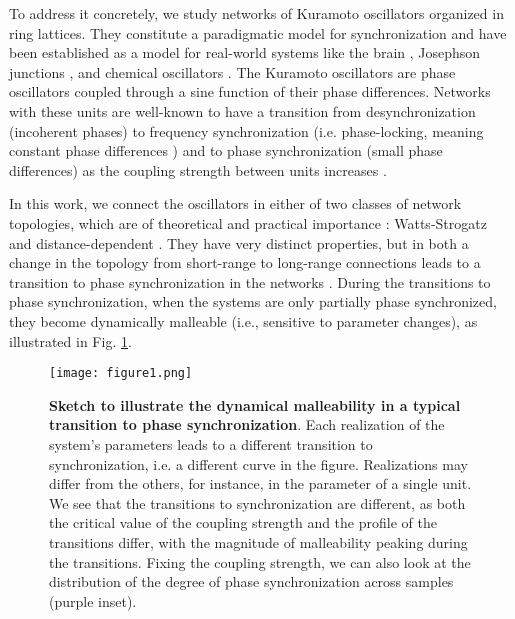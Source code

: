 To address it concretely, we study networks of Kuramoto oscillators organized in ring lattices. They constitute a paradigmatic model for synchronization \cite{kuramoto1975self,acebron2005kuramoto,rodrigues2016the} and have been established as a model for real-world systems like the brain \cite{poncealvarez2015restingstate, cabral2011role, rodrigues2016the}, Josephson junctions \cite{josephson1964coupled, crotty2010josephson}, and chemical oscillators \cite{marek1975synchronization, neu1979chemical}.  The Kuramoto oscillators are phase oscillators coupled through a sine function of their phase differences. Networks with these units are well-known to have a transition from desynchronization (incoherent phases) to frequency synchronization (i.e. phase-locking, meaning constant phase differences \cite{pikovsky2001synchronization}) and to phase synchronization (small phase differences) \cite{rosenblum1996phase} as the coupling strength between units increases \cite{rodrigues2016the, acebron2005kuramoto}. 

In this work, we connect the oscillators in either of two classes of network topologies, which are of theoretical and practical importance \cite{albert2002statistical}: Watts-Strogatz \cite{watts1998collective, humphries2008network, telesford2011the} and distance-dependent \cite{rogers1996phasetransitions, rubinov2015wiring}. They have very distinct properties, but in both a change in the topology from short-range to long-range connections leads to a transition to phase synchronization in the networks \cite{hong2002synchronization, rogers1996phasetransitions}. During the transitions to phase synchronization, when the systems are only partially phase synchronized, they become dynamically malleable (i.e., sensitive to parameter changes), as illustrated in Fig. \ref{fig:sketchmalleability}. 
%
\begin{figure}[htb!]
    \centering
    \texttt{[image: figure1.png]}
    \caption{\textbf{Sketch to illustrate the dynamical malleability in a typical transition to phase synchronization}. Each realization of the system's parameters leads to a different transition to synchronization, i.e. a different curve in the figure. Realizations may differ from the others, for instance, in the parameter of a single unit. We see that the transitions to synchronization are different, as both the critical value of the coupling strength and the profile of the transitions differ, with the magnitude of malleability peaking during the transitions. Fixing the coupling strength, we can also look at the distribution of the degree of phase synchronization across samples (purple inset).}
  \label{fig:sketchmalleability}
\end{figure}

